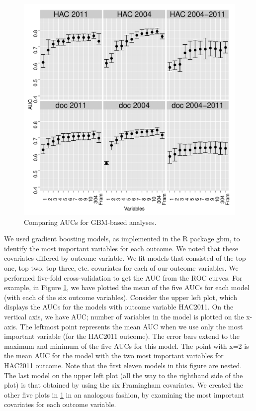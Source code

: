 \documentclass[11pt,]{article}
\begin{document}
\begin{figure}[htbp]
\centering
\includegraphics{from-mike/gbm-all-cv.pdf}
\caption{Comparing AUCs for GBM-based analyses.}
\label{figure:auc1}
\end{figure}

We used gradient boosting models, as implemented in the R package gbm,
to identify the most important variables for each outcome. We noted that
these covariates differed by outcome variable. We fit models that
consisted of the top one, top two, top three, etc. covariates for each
of our outcome variables. We performed five-fold cross-validation to get
the AUC from the ROC curves. For example, in Figure \ref{figure:auc1},
we have plotted the mean of the five AUCs for each model (with each of
the six outcome variables). Consider the upper left plot, which displays
the AUCs for the models with outcome variable HAC2011. On the vertical
axis, we have AUC; number of variables in the model is plotted on the
x-axis. The leftmost point represents the mean AUC when we use only the
most important variable (for the HAC2011 outcome). The error bars extend
to the maximum and minimum of the five AUCs for this model. The point
with x=2 is the mean AUC for the model with the two most important
variables for HAC2011 outcome. Note that the first eleven models in this
figure are nested. The last model on the upper left plot (all the way to
the righthand side of the plot) is that obtained by using the six
Framingham covariates. We created the other five plots in
\ref{figure:auc1} in an analogous fashion, by examining the most
important covariates for each outcome variable.
\end{document}
